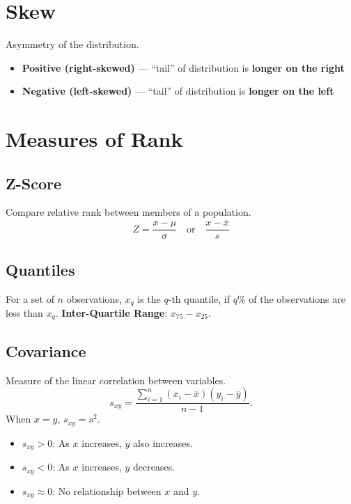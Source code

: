 \documentclass{article}
\begin{document}
\begin{multicols}{3}
    \section{Skew}
    Asymmetry of the distribution.
    \begin{itemize}
        \item \textbf{Positive (right-skewed)} --- ``tail'' of distribution is \textbf{longer on the right}
        \item \textbf{Negative (left-skewed)} --- ``tail'' of distribution is \textbf{longer on the left}
    \end{itemize}
    \section{Measures of Rank}
    \subsection{Z-Score}
    Compare relative rank between members of a population.
    \begin{equation*}
        Z = \frac{x  - \mu}{\sigma} \quad \text{or} \quad \frac{x - \overline{x}}{s}
    \end{equation*}
    \subsection{Quantiles}
    For a set of \(n\) observations, \(x_q\) is the \(q\)-th quantile, if \(q\)\% of the observations are less than \(x_q\).
    \textbf{Inter-Quartile Range}: \(x_{75} - x_{25}\).
    \subsection{Covariance}
    Measure of the linear correlation between variables.
    \begin{equation*}
        s_{xy} = \frac{\sum_{i = 1}^n \left( x_i - \overline{x} \right) \left( y_i - \overline{y} \right)}{n - 1}.
    \end{equation*}
    When \(x = y\), \(s_{xy} = s^2\).
    \begin{itemize}
        \item \(s_{xy} > 0\): As \(x\) increases, \(y\) also increases.
        \item \(s_{xy} < 0\): As \(x\) increases, \(y\) decreases.
        \item \(s_{xy} \approx 0\): No relationship between \(x\) and \(y\).
    \end{itemize}

\end{multicols}
\end{document}
